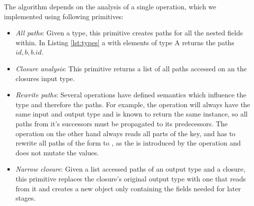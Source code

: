 The algorithm depends on the analysis of a single operation, which we implemented using following primitives:
\begin{itemize}
\item \emph{All paths}: Given a type, this primitive creates paths for all the nested fields within. In Listing \ref{lst:types} a  with elements of type A returns the paths ${id, b, b.id}$. 
\item \emph{Closure analysis}: This primitive returns a list of all paths accessed on an the closures input type.%
\item \emph{Rewrite paths}: Several operations have defined semantics which influence the type and therefore the paths. For example, the  operation will always have the same input and output type and is known to return the same instance, so all paths from it's successors must be propagated to its predecessors. The  operation on the other hand always reads all parts of the key, and has to rewrite all paths of the form  to , as the  is introduced by the  operation and does not mutate the values.
\item \emph{Narrow closure}: Given a list accessed paths of an output type and a closure, this primitive replaces the closure's original output type with one that reads from it and creates a new object only containing the fields needed for later stages.
\end{itemize}

